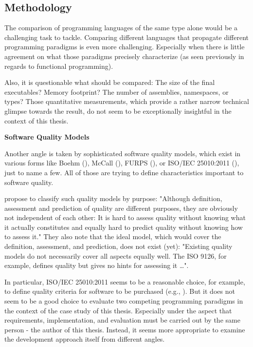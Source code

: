 \subsection{Methodology}

The comparison of programming languages of the same type alone would be a challenging task to tackle. Comparing different languages that propagate different programming paradigms is even more challenging. Especially when there is little agreement on what those paradigms precisely characterize (as seen previously in regards to functional programming).

Also, it is questionable what should be compared: The size of the final executables? Memory footprint? The number of assemblies, namespaces, or types? Those quantitative measurements, which provide a rather narrow technical glimpse towards the result, do not seem to be exceptionally insightful in the context of this thesis.

\newpage
\textbf{Software Quality Models}

Another angle is taken by sophisticated software quality models, which exist in various forms like Boehm (\cite{boehm_quantitative_1976}), McCall (\cite{mccall_factors_1977}), FURPS (\cite{grady_successfully_1994}), or ISO/IEC 25010:2011 (\cite{international_organization_for_standardization_iso/iec_2011}), just to name a few. All of those are trying to define characteristics important to software quality. 

\cite{deissenboeck_software_2009} propose to classify such quality models by purpose: "Although definition, assessment and prediction of quality are different purposes, they are obviously not independent of each other: It is hard to assess quality without knowing what it actually constitutes and equally hard to predict quality without knowing how to assess it." They also note that the ideal model, which would cover the definition, assessment, and prediction, does not exist (yet): "Existing quality models do not necessarily cover all aspects equally well. The ISO 9126, for example, defines quality but gives no hints for assessing it \dots". 

In particular, ISO/IEC 25010:2011 seems to be a reasonable choice, for example, to define quality criteria for software to be purchased (e.g., \cite{chua_applying_2004}). But it does not seem to be a good choice to evaluate two competing programming paradigms in the context of the case study of this thesis. Especially under the aspect that requirements, implementation, and evaluation must be carried out by the same person - the author of this thesis. Instead, it seems more appropriate to examine the development approach itself from different angles.

